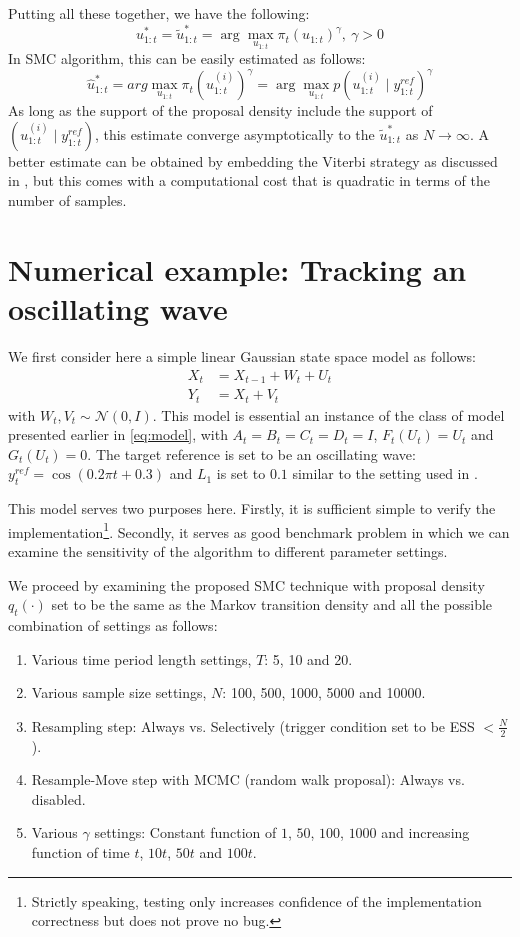 Putting all these together, we have the following:
\begin{equation}
  u^*_{1:t} = \tilde{u}^*_{1:t} = \arg\max_{u_{1:t}} \pi_t(u_{1:t})^\gamma,~\gamma > 0
\end{equation}
In SMC algorithm, this can be easily estimated as follows:
\begin{equation}
\hat{u}^*_{1:t} = arg\max_{u_{1:t}} \pi_t(u^{(i)}_{1:t})^\gamma = \arg\max_{u_{1:t}} p(u^{(i)}_{1:t} \mid y^{ref}_{1:t})^\gamma
\end{equation}
As long as the support of the proposal density include the support of $(u^{(i)}_{1:t} \mid y^{ref}_{1:t})$, this estimate converge asymptotically to the $\tilde{u}^*_{1:t}$ as $N \to \infty$. A better estimate can be obtained by embedding the Viterbi strategy as discussed in \cite{SG01}, but this comes with a computational cost that is quadratic in terms of the number of samples.

\section{Numerical example: Tracking an oscillating wave}
\label{sec:exp1}
We first consider here a simple linear Gaussian state space model as follows:
\begin{align}
  X_t &= X_{t-1} + W_t + U_t \nonumber \\
  Y_t &= X_t + V_t
\label{eq:refnmodel}
\end{align}
with $W_t, V_t \sim \mathcal{N}(0,I)$. This model is essential an instance of the class of model presented earlier in \eqref{eq:model}, with $A_t=B_t=C_t=D_t=I$, $F_t(U_t)=U_t$ and $G_t(U_t)=0$. The target reference is set to be an oscillating wave: $y^{ref}_t = \cos(0.2 \pi t + 0.3)$ and $L_1$ is set to $0.1$ similar to the setting used in \cite{NK11}.

This model serves two purposes here. Firstly, it is sufficient simple to verify the implementation\footnote{Strictly speaking, testing only increases confidence of the implementation correctness but does not prove no bug.}. Secondly, it serves as good benchmark problem in which we can examine the sensitivity of the algorithm to different parameter settings.

We proceed by examining the proposed SMC technique with proposal density $q_t(\cdot)$ set to be the same as the Markov transition density and all the possible combination of settings as follows:
\begin{enumerate}
\item Various time period length settings, $T$: 5, 10 and 20.
\item Various sample size settings, $N$: 100, 500, 1000, 5000 and 10000.
\item Resampling step: Always vs. Selectively (trigger condition set to be ESS $< \frac{N}{2}$).
\item Resample-Move step with MCMC (random walk proposal): Always vs. disabled.
\item Various $\gamma$ settings: Constant function of $1$, $50$, $100$, $1000$ and increasing function of time $t$, $10t$, $50t$ and $100t$.
\end{enumerate}

